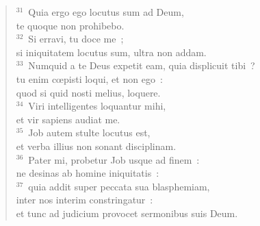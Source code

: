\begin{flushleft}
\begin{verse}
${}^{31}$~Quia ergo ego locutus sum ad Deum,\\ te quoque non prohibebo.\\
${}^{32}$~Si erravi, tu doce me~;\\ si iniquitatem locutus sum, ultra non addam.\\
${}^{33}$~Numquid a te Deus expetit eam, quia displicuit tibi~?\\ tu enim cœpisti loqui, et non ego~:\\ quod si quid nosti melius, loquere.\\
${}^{34}$~Viri intelligentes loquantur mihi,\\ et vir sapiens audiat me.\\
${}^{35}$~Job autem stulte locutus est,\\ et verba illius non sonant disciplinam.\\
${}^{36}$~Pater mi, probetur Job usque ad finem~:\\ ne desinas ab homine iniquitatis~:\\
${}^{37}$~quia addit super peccata sua blasphemiam,\\ inter nos interim constringatur~:\\ et tunc ad judicium provocet sermonibus suis Deum.\end{verse}\end{flushleft}




